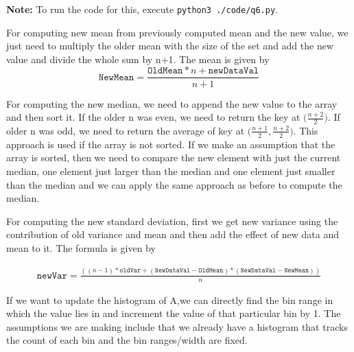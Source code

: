 \begin{tcolorbox}[breakable]
	\begin{sol}
		\textbf{Note: } To run the code for this, execute
		\texttt{python3 ./code/q6.py}.

		For computing new mean from previously computed mean and the
		new value, we just need to multiply the older mean with the
		size of the set and add the new value and divide the whole sum
		by n+1. The mean is given by
		\begin{equation}
			\texttt{NewMean}=\frac{\texttt{OldMean}*n+\texttt{newDataVal}}{n+1}
		\end{equation}

		For computing the new median, we need to append the new value
		to the array and then sort it. If the older n was even, we need
		to return the key at $\big(\frac{n+2}{2}\big)$. If older n was
		odd, we need to return the average of key at
		$\big(\frac{n+1}{2},\frac{n+2}{2}\big)$. This approach is used
		if the array is not sorted. If we make an assumption that the
		array is sorted, then we need to compare the new element with
		just the current median, one element just larger than the
		median and one element just smaller than the median and we can
		apply the same approach as before to compute the median. \par
		For computing the new standard deviation, first we get new
		variance using the contribution of old variance and mean and
		then add the effect of new data and mean to it. The formula is
		given by

		\begin{align}
			\texttt{newVar}=\frac{((n-1)*\texttt{oldVar}+(\texttt{NewDataVal}-\texttt{OldMean})*(\texttt{NewDataVal}-\texttt{NewMean}))}{n}
		\end{align}

		\par If we want to update the histogram of A,we can directly
		find the bin range in which the value lies in and increment the
		value of that particular bin by 1. The assumptions we are
		making include that we already have a histogram that tracks the
		count of each bin and the bin ranges/width are fixed.
	\end{sol}
\end{tcolorbox}
